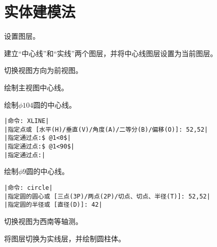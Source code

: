 \section{实体建模法}
\begin{procedure}
\item 设置图层。

建立“中心线”和“实线”两个图层，并将中心线图层设置为当前图层。
\item 切换视图方向为前视图。

\item 绘制主视图中心线。

绘制$\phi 104$圆的中心线。
\begin{lstlisting}
|命令: XLINE|
|指定点或 [水平(H)/垂直(V)/角度(A)/二等分(B)/偏移(O)]: 52,52|
|指定通过点:$ @1<0$|
|指定通过点:$ @1<90$|
|指定通过点:|
\end{lstlisting}
绘制$\phi 9$圆的中心线。
\begin{lstlisting}
|命令: circle|
|指定圆的圆心或 [三点(3P)/两点(2P)/切点、切点、半径(T)]: 52,52|
|指定圆的半径或 [直径(D)]: 42|
\end{lstlisting}
\item 切换视图为西南等轴测。
\item 将图层切换为实线层，并绘制圆柱体。


\end{procedure}
